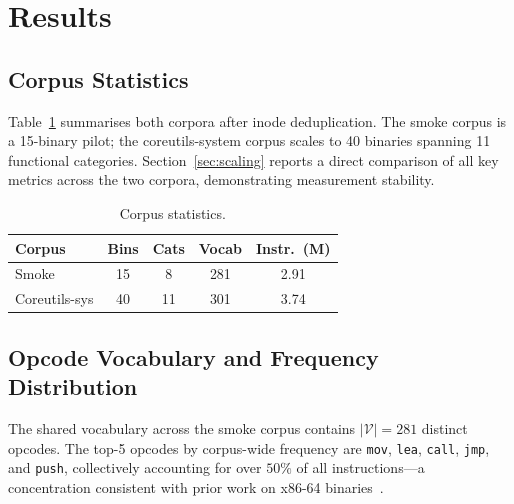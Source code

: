 \documentclass[10pt,twocolumn]{article}
\begin{document}
\section{Results}
\label{sec:results}

\subsection{Corpus Statistics}

Table~\ref{tab:corpus} summarises both corpora after inode deduplication.
The smoke corpus is a 15-binary pilot; the coreutils-system corpus
scales to 40 binaries spanning 11 functional categories.
Section~\ref{sec:scaling} reports a direct comparison of all key metrics
across the two corpora, demonstrating measurement stability.

\begin{table}[h]
\centering
\caption{Corpus statistics.}
\label{tab:corpus}
\small
\begin{tabular}{@{}lcccc@{}}
\toprule
\textbf{Corpus} & \textbf{Bins} & \textbf{Cats} & \textbf{Vocab} & \textbf{Instr.\ (M)} \\
\midrule
Smoke            & 15  & 8   & 281 & 2.91 \\
Coreutils-sys    & 40  & 11  & 301 & 3.74 \\
\bottomrule
\end{tabular}
\end{table}

\subsection{Opcode Vocabulary and Frequency Distribution}

The shared vocabulary across the smoke corpus contains $|\mathcal{V}| = 281$
distinct opcodes.  The top-5 opcodes by corpus-wide frequency are
\texttt{mov}, \texttt{lea}, \texttt{call}, \texttt{jmp}, and \texttt{push},
collectively accounting for over $50\%$ of all instructions---a concentration
consistent with prior work on x86-64 binaries~\cite{bilar2007opcodes}.
\end{document}
